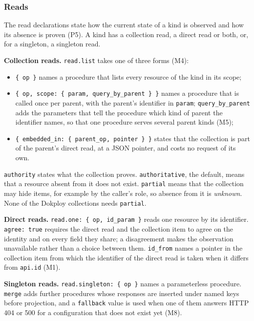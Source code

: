\subsubsection*{Reads}

The read declarations state how the current state of a kind is observed and how its absence is proven
(P5). A kind has a collection read, a direct read or both, or, for a singleton, a singleton read.

\textbf{Collection reads.} \texttt{read.list} takes one of three forms (M4):

\begin{itemize}
\item
  \texttt{\{\ op\ \}} names a procedure that lists every resource of the kind in its scope;
\item
  \texttt{\{\ op,\ scope:\ \{\ param,\ query\_by\_parent\ \}\ \}} names a procedure that is called once per parent, with
  the parent's identifier in \texttt{param}; \texttt{query\_by\_parent} adds the parameters that tell the procedure
  which kind of parent the identifier names, so that one procedure serves several parent kinds (M5);
\item
  \texttt{\{\ embedded\_in:\ \{\ parent\_op,\ pointer\ \}\ \}} states that the collection is part of the parent's direct
  read, at a JSON pointer, and costs no request of its own.
\end{itemize}

\texttt{authority} states what the collection proves. \texttt{authoritative}, the default, means that a resource
absent from it does not exist. \texttt{partial} means that the collection may hide items, for example by the
caller's role, so absence from it is \emph{unknown}. None of the Dokploy collections needs \texttt{partial}.

\textbf{Direct reads.} \texttt{read.one:\ \{\ op,\ id\_param\ \}} reads one resource by its identifier. \texttt{agree:\ true}
requires the direct read and the collection item to agree on the identity and on every field they
share; a disagreement makes the observation unavailable rather than a choice between them. \texttt{id\_from}
names a pointer in the collection item from which the identifier of the direct read is taken when it
differs from \texttt{api.id} (M1).

\textbf{Singleton reads.} \texttt{read.singleton:\ \{\ op\ \}} names a parameterless procedure. \texttt{merge} adds further
procedures whose responses are inserted under named keys before projection, and a \texttt{fallback} value is
used when one of them answers HTTP 404 or 500 for a configuration that does not exist yet (M8).

